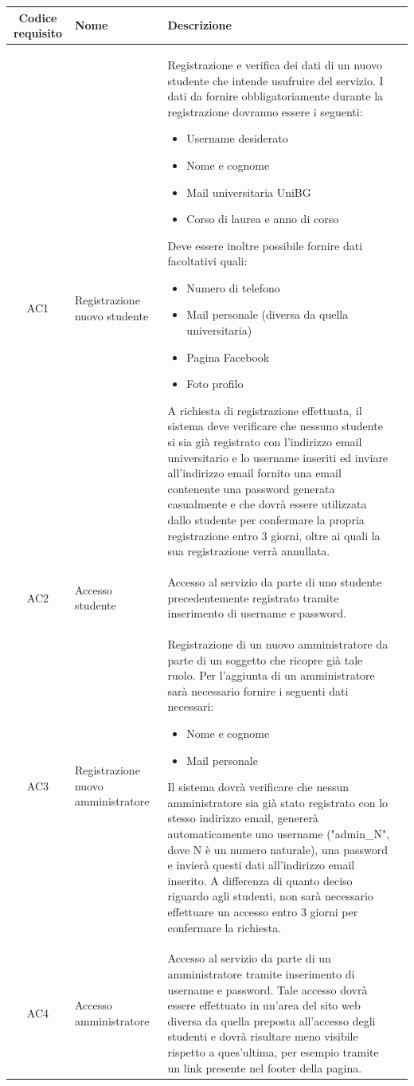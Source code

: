 \documentclass[10pt,a4paper]{report}
\begin{document}
	\begin{tabular}{cp{3cm}p{9cm}p{1cm}}
		Codice requisito&Nome&Descrizione\\ \hline
		AC1&Registrazione nuovo studente&Registrazione e verifica dei dati di un nuovo studente che intende usufruire del servizio. I dati da fornire obbligatoriamente durante la registrazione dovranno essere i seguenti:
		\begin{itemize}
			\item Username desiderato
			\item Nome e cognome
			\item Mail universitaria UniBG
			\item Corso di laurea e anno di corso
		\end{itemize}
		Deve essere inoltre possibile fornire dati facoltativi quali:
		\begin{itemize}
			\item Numero di telefono
			\item Mail personale (diversa da quella universitaria)
			\item Pagina Facebook
			\item Foto profilo
		\end{itemize}
		A richiesta di registrazione effettuata, il sistema deve verificare che nessuno studente si sia già registrato con l'indirizzo email universitario e lo username inseriti ed inviare all'indirizzo email fornito una email contenente una password generata casualmente e che dovrà essere utilizzata dallo studente per confermare la propria registrazione entro 3 giorni, oltre ai quali la sua registrazione verrà annullata.\\ \hline
		AC2&Accesso studente&Accesso al servizio da parte di uno studente precedentemente registrato tramite inserimento di username e password.\\ \hline
		AC3&Registrazione nuovo amministratore&Registrazione di un nuovo amministratore da parte di un soggetto che ricopre già tale ruolo. Per l'aggiunta di un amministratore sarà necessario fornire i seguenti dati necessari:
		\begin{itemize}
			\item Nome e cognome
			\item Mail personale
		\end{itemize}
		Il sistema dovrà verificare che nessun amministratore sia già stato registrato con lo stesso indirizzo email, genererà automaticamente uno username ("admin\_N", dove N è un numero naturale), una password e invierà questi dati all'indirizzo email inserito. A differenza di quanto deciso riguardo agli studenti, non sarà necessario effettuare un accesso entro 3 giorni per confermare la richiesta.\\ \hline
		AC4&Accesso amministratore&Accesso al servizio da parte di un amministratore tramite inserimento di username e password. Tale accesso dovrà essere effettuato in un'area del sito web diversa da quella preposta all'accesso degli studenti e dovrà risultare meno visibile rispetto a ques'ultima, per esempio tramite un link presente nel footer della pagina.\\ \hline
	\end{tabular}
\end{document}
